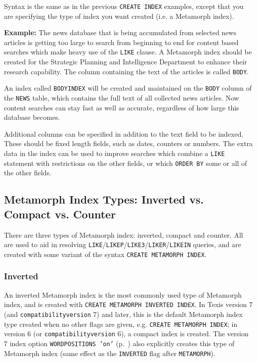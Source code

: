 Syntax is the same as in the previous {\tt CREATE INDEX} examples,
except that you are specifying the type of index you want created
(i.e. a Metamorph index).

{\bf Example:}
The news database that is being accumulated from selected news
articles is getting too large to search from beginning to end for
content based searches which make heavy use of the \verb`LIKE` clause.  A
Metamorph index should be created for the Strategic Planning and
Intelligence Department to enhance their research capability.  The
column containing the text of the articles is called \verb`BODY`.

An index called \verb`BODYINDEX` will be created and maintained on the
\verb`BODY` column of the \verb`NEWS` table, which contains the full
text of all collected news articles.  Now content searches can stay
fast as well as accurate, regardless of how large this database
becomes.

Additional columns can be specified in addition to the text field to
be indexed.  These should be fixed length fields, such as dates,
counters or numbers.  The extra data in the index can be used to
improve searches which combine a \verb`LIKE` statement with restrictions
on the other fields, or which {\tt ORDER BY} some or all of the other fields.

\subsection{Metamorph Index Types: Inverted vs. Compact vs. Counter}

  There are three types of Metamorph index: inverted, compact and
counter.  All are used to aid in resolving
\verb`LIKE`/\verb`LIKEP`/\verb`LIKE3`/\verb`LIKER`/\verb`LIKEIN`
queries, and are created with some variant of the syntax {\tt CREATE
METAMORPH INDEX}.

\subsubsection{Inverted}

An inverted Metamorph index is the most commonly used type of
Metamorph index, and is created with {\tt CREATE METAMORPH INVERTED
  INDEX}.  In Texis version 7 (and \verb`compatibilityversion` 7) and
later, this is the default Metamorph index type created when no other
flags are given, e.g. {\tt CREATE METAMORPH INDEX}; in version 6 (or
\verb`compatibilityversion` 6), a compact index is created.  The
version 7 index option {\tt WORDPOSITIONS 'on'}
(p.~\pageref{IndexOptions}) also explicitly creates this type of
Metamorph index (same effect as the \verb`INVERTED` flag after
\verb`METAMORPH`).

